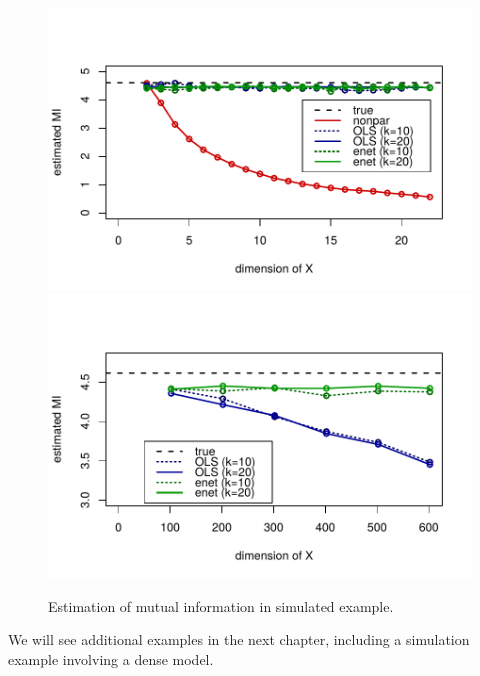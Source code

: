 \begin{figure}
\centering
\includegraphics[scale = 0.8]{Figures/sim2a_fig1_edited.pdf}
\includegraphics[scale = 0.8]{Figures/sim2a_fig3_edited.pdf}
\caption{Estimation of mutual information in simulated example.}
\label{fig:ch4_simulation}
\end{figure}

We will see additional examples in the next chapter, including a
simulation example involving a dense model.
